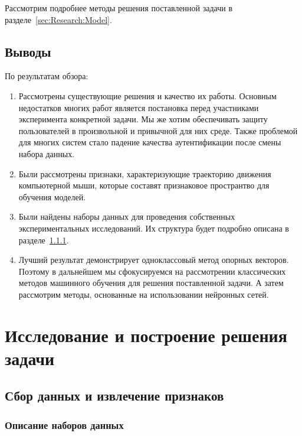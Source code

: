 \documentclass[12pt]{article}
\begin{document}
    Рассмотрим подробнее методы решения поставленной задачи в разделе~\ref{sec:Research:Model}.


    \subsection{Выводы}
    \label{sec:Overview:Conclusions}

    По результатам обзора:
    \begin{enumerate}
        \item Рассмотрены существующие решения и качество их работы. Основным недостатков многих работ является постановка перед участниками эксперимента конкретной задачи. Мы же хотим обеспечивать защиту пользователей в произвольной и привычной для них среде. Также проблемой для многих систем стало падение качества аутентификации после смены набора данных.
        \item Были рассмотрены признаки, характеризующие траекторию движения компьютерной мыши, которые составят признаковое пространтво для обучения моделей.
        \item Были найдены наборы данных для проведения собственных экспериментальных исследований. Их структура будет подробно описана в разделе~\ref{sec:Research:Data:Description}.
        \item Лучший результат демонстрирует одноклассовый метод опорных векторов. Поэтому в дальнейшем мы сфокусируемся на рассмотрении классических методов машинного обучения для решения поставленной задачи. А затем рассмотрим методы, основанные на использовании нейронных сетей.
    \end{enumerate}

    \newpage



    \section{Исследование и построение решения задачи}
    \label{sec:Research}

    \subsection{Сбор данных и извлечение признаков}
    \label{sec:Research:Data}

    \subsubsection{Описание наборов данных}
    \label{sec:Research:Data:Description}
\end{document}
